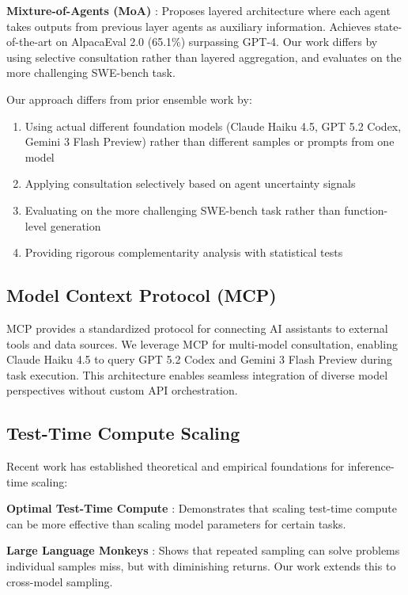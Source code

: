 \documentclass[11pt,a4paper]{article}
\begin{document}
\textbf{Mixture-of-Agents (MoA)} \citep{wang2024moa}: Proposes layered architecture where each agent takes outputs from previous layer agents as auxiliary information. Achieves state-of-the-art on AlpacaEval 2.0 (65.1\%) surpassing GPT-4. Our work differs by using selective consultation rather than layered aggregation, and evaluates on the more challenging SWE-bench task.

Our approach differs from prior ensemble work by:
\begin{enumerate}
    \item Using actual different foundation models (Claude Haiku 4.5, GPT 5.2 Codex, Gemini 3 Flash Preview) rather than different samples or prompts from one model
    \item Applying consultation selectively based on agent uncertainty signals
    \item Evaluating on the more challenging SWE-bench task rather than function-level generation
    \item Providing rigorous complementarity analysis with statistical tests
\end{enumerate}

\subsection{Model Context Protocol (MCP)}

MCP \citep{anthropic2024mcp} provides a standardized protocol for connecting AI assistants to external tools and data sources. We leverage MCP for multi-model consultation, enabling Claude Haiku 4.5 to query GPT 5.2 Codex and Gemini 3 Flash Preview during task execution. This architecture enables seamless integration of diverse model perspectives without custom API orchestration.

\subsection{Test-Time Compute Scaling}

Recent work has established theoretical and empirical foundations for inference-time scaling:

\textbf{Optimal Test-Time Compute} \citep{snell2024scaling}: Demonstrates that scaling test-time compute can be more effective than scaling model parameters for certain tasks.

\textbf{Large Language Monkeys} \citep{brown2024monkeys}: Shows that repeated sampling can solve problems individual samples miss, but with diminishing returns. Our work extends this to cross-model sampling.
\end{document}
